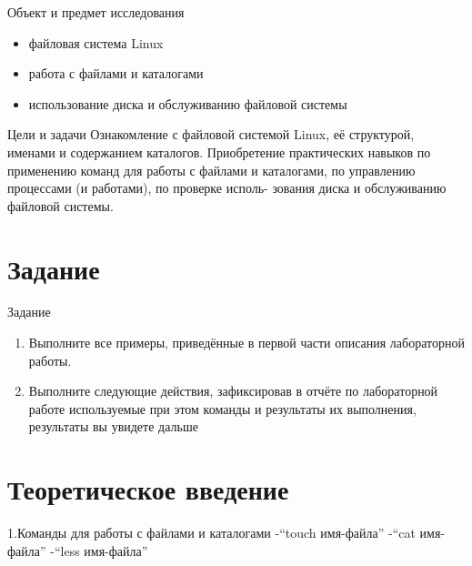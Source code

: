 \documentclass[
  ignorenonframetext,
  aspectratio=169,
  russian,
]{beamer}
\providecommand{\tightlist}{%
  \setlength{\itemsep}{0pt}\setlength{\parskip}{0pt}}
\begin{document}
\begin{frame}{Объект и предмет исследования}
\label{ux43eux431ux44aux435ux43aux442-ux438-ux43fux440ux435ux434ux43cux435ux442-ux438ux441ux441ux43bux435ux434ux43eux432ux430ux43dux438ux44f}
\begin{itemize}[<+->]
\tightlist
\item
  файловая система Linux
\item
  работа с файлами и каталогами
\item
  использование диска и обслуживанию файловой системы
\end{itemize}
\end{frame}

\begin{frame}{Цели и задачи}
\label{ux446ux435ux43bux438-ux438-ux437ux430ux434ux430ux447ux438}
Ознакомление с файловой системой Linux, её структурой, именами и
содержанием каталогов. Приобретение практических навыков по применению
команд для работы с файлами и каталогами, по управлению процессами (и
работами), по проверке исполь- зования диска и обслуживанию файловой
системы.
\end{frame}

\section{Задание}\label{ux437ux430ux434ux430ux43dux438ux435}

\begin{frame}{Задание}
\begin{enumerate}[<+->]
\tightlist
\item
  Выполните все примеры, приведённые в первой части описания
  лабораторной работы.
\item
  Выполните следующие действия, зафиксировав в отчёте по лабораторной
  работе используемые при этом команды и результаты их выполнения,
  результаты вы увидете дальше
\end{enumerate}
\end{frame}

\section{Теоретическое
введение}\label{ux442ux435ux43eux440ux435ux442ux438ux447ux435ux441ux43aux43eux435-ux432ux432ux435ux434ux435ux43dux438ux435}

\begin{frame}{1.Команды для работы с файлами и каталогами}
\label{ux43aux43eux43cux430ux43dux434ux44b-ux434ux43bux44f-ux440ux430ux431ux43eux442ux44b-ux441-ux444ux430ux439ux43bux430ux43cux438-ux438-ux43aux430ux442ux430ux43bux43eux433ux430ux43cux438}
-\enquote{touch имя-файла} -\enquote{cat имя-файла} -\enquote{less
имя-файла}
\end{frame}
\end{document}
